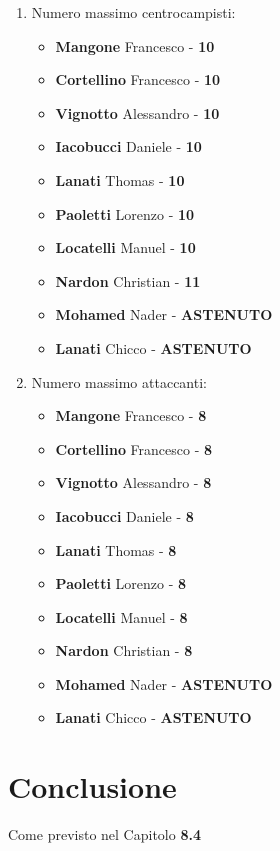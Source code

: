 \documentclass[12pt]{article}
\begin{document}
\begin{enumerate}
    \item Numero massimo centrocampisti:
    \begin{itemize}
        \item \textbf{Mangone} Francesco - \textbf{10}
        \item \textbf{Cortellino} Francesco - \textbf{10}
        \item \textbf{Vignotto} Alessandro - \textbf{10}
        \item \textbf{Iacobucci} Daniele - \textbf{10}
        \item \textbf{Lanati} Thomas - \textbf{10}
        \item \textbf{Paoletti} Lorenzo - \textbf{10}
        \item \textbf{Locatelli} Manuel - \textbf{10}
        \item \textbf{Nardon} Christian - \textbf{11}
        \item \textbf{Mohamed} Nader - \textbf{ASTENUTO}
        \item \textbf{Lanati} Chicco - \textbf{ASTENUTO}
    \end{itemize}

    \item Numero massimo attaccanti:
    \begin{itemize}
        \item \textbf{Mangone} Francesco - \textbf{8}
        \item \textbf{Cortellino} Francesco - \textbf{8}
        \item \textbf{Vignotto} Alessandro - \textbf{8}
        \item \textbf{Iacobucci} Daniele - \textbf{8}
        \item \textbf{Lanati} Thomas - \textbf{8}
        \item \textbf{Paoletti} Lorenzo - \textbf{8}
        \item \textbf{Locatelli} Manuel - \textbf{8}
        \item \textbf{Nardon} Christian - \textbf{8}
        \item \textbf{Mohamed} Nader - \textbf{ASTENUTO}
        \item \textbf{Lanati} Chicco - \textbf{ASTENUTO}
    \end{itemize}
\end{enumerate}

\newpage
\section*{Conclusione}
Come previsto nel Capitolo \textbf{8.4}
\end{document}
